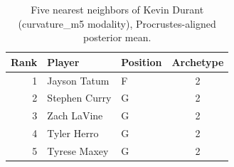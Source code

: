 \begin{table}[htbp]
  \centering\small
  \begin{tabular}{rllc}
    \toprule
    Rank & Player & Position & Archetype \\
    \midrule
    1 & Jayson Tatum & F & 2 \\
    2 & Stephen Curry & G & 2 \\
    3 & Zach LaVine & G & 2 \\
    4 & Tyler Herro & G & 2 \\
    5 & Tyrese Maxey & G & 2 \\
    \bottomrule
  \end{tabular}
  \caption{Five nearest neighbors of Kevin Durant (curvature_m5 modality), Procrustes-aligned posterior mean.}
  \label{tab:Kevin_Durant_neighbors_curvature_m5}
\end{table}


